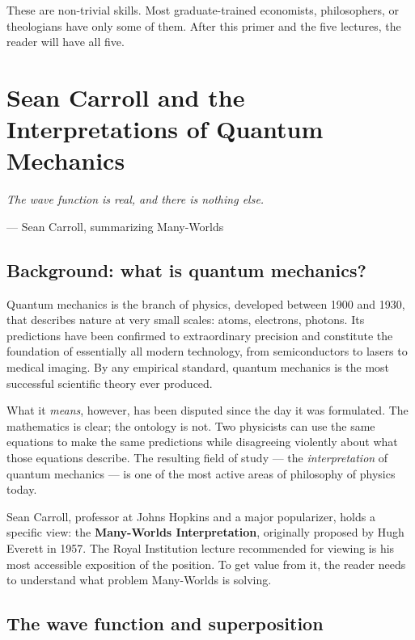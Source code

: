 \documentclass[11pt,a4paper]{book}
\theoremstyle{cleanrm}
\begin{document}
These are non-trivial skills. Most graduate-trained economists,
philosophers, or theologians have only some of them. After this
primer and the five lectures, the reader will have all five.

\chapter{Sean Carroll and the Interpretations of Quantum Mechanics}

\epigraph{\itshape The wave function is real, and there is nothing else.}
{--- Sean Carroll, summarizing Many-Worlds}

\section{Background: what is quantum mechanics?}

Quantum mechanics is the branch of physics, developed between 1900 and
1930, that describes nature at very small scales: atoms, electrons,
photons. Its predictions have been confirmed to extraordinary
precision and constitute the foundation of essentially all modern
technology, from semiconductors to lasers to medical imaging. By any
empirical standard, quantum mechanics is the most successful scientific
theory ever produced.

What it \emph{means}, however, has been disputed since the day it was
formulated. The mathematics is clear; the ontology is not. Two physicists
can use the same equations to make the same predictions while disagreeing
violently about what those equations describe. The resulting field of
study --- the \emph{interpretation} of quantum mechanics --- is one of
the most active areas of philosophy of physics today.

Sean Carroll, professor at Johns Hopkins and a major popularizer, holds
a specific view: the \textbf{Many-Worlds Interpretation}, originally
proposed by Hugh Everett in 1957. The Royal Institution lecture
recommended for viewing is his most accessible exposition of the
position. To get value from it, the reader needs to understand what
problem Many-Worlds is solving.

\section{The wave function and superposition}
\end{document}
